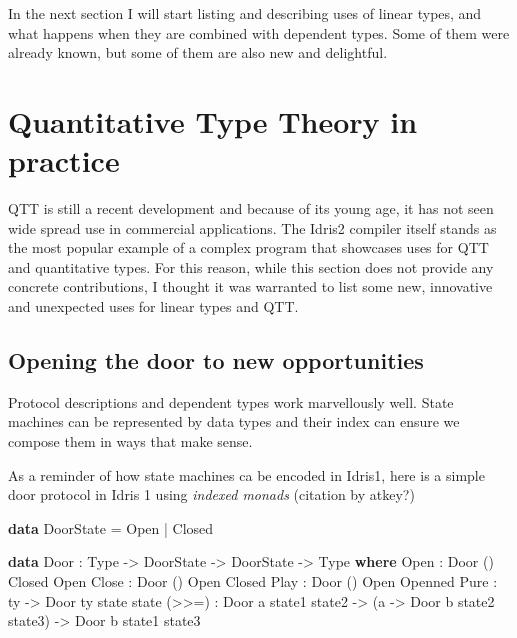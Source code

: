 \documentclass[
]{article}
\newenvironment{Shaded}{}{}
\newcommand{\DataTypeTok}[1]{\textcolor[rgb]{0.56,0.13,0.00}{#1}}
\newcommand{\KeywordTok}[1]{\textcolor[rgb]{0.00,0.44,0.13}{\textbf{#1}}}
\newcommand{\NormalTok}[1]{#1}
\newcommand{\OperatorTok}[1]{\textcolor[rgb]{0.40,0.40,0.40}{#1}}
\newcommand{\OtherTok}[1]{\textcolor[rgb]{0.00,0.44,0.13}{#1}}
\begin{document}
In the next section I will start listing and describing uses of linear
types, and what happens when they are combined with dependent types.
Some of them were already known, but some of them are also new and
delightful.

\hypertarget{quantitative-type-theory-in-practice}{%
\section{Quantitative Type Theory in
practice}\label{quantitative-type-theory-in-practice}}

QTT is still a recent development and because of its young age, it has
not seen wide spread use in commercial applications. The Idris2 compiler
itself stands as the most popular example of a complex program that
showcases uses for QTT and quantitative types. For this reason, while
this section does not provide any concrete contributions, I thought it
was warranted to list some new, innovative and unexpected uses for
linear types and QTT.

\hypertarget{opening-the-door-to-new-opportunities}{%
\subsection{Opening the door to new
opportunities}\label{opening-the-door-to-new-opportunities}}

Protocol descriptions and dependent types work marvellously well. State
machines can be represented by data types and their index can ensure we
compose them in ways that make sense.

As a reminder of how state machines ca be encoded in Idris1, here is a
simple door protocol in Idris 1 using \emph{indexed monads} (citation by
atkey?)

\begin{Shaded}
\begin{Highlighting}[]
\KeywordTok{data} \DataTypeTok{DoorState} \OtherTok{=} \DataTypeTok{Open} \OperatorTok{|} \DataTypeTok{Closed}

\KeywordTok{data} \DataTypeTok{Door} \OperatorTok{:} \DataTypeTok{Type} \OtherTok{{-}\textgreater{}} \DataTypeTok{DoorState} \OtherTok{{-}\textgreater{}} \DataTypeTok{DoorState} \OtherTok{{-}\textgreater{}} \DataTypeTok{Type} \KeywordTok{where} 
    \DataTypeTok{Open} \OperatorTok{:} \DataTypeTok{Door}\NormalTok{ () }\DataTypeTok{Closed} \DataTypeTok{Open}
    \DataTypeTok{Close} \OperatorTok{:} \DataTypeTok{Door}\NormalTok{ () }\DataTypeTok{Open} \DataTypeTok{Closed}
    \DataTypeTok{Play} \OperatorTok{:} \DataTypeTok{Door}\NormalTok{ () }\DataTypeTok{Open} \DataTypeTok{Openned}
    \DataTypeTok{Pure} \OperatorTok{:}\NormalTok{ ty }\OtherTok{{-}\textgreater{}} \DataTypeTok{Door}\NormalTok{ ty state state}
\NormalTok{    (}\OperatorTok{\textgreater{}\textgreater{}=}\NormalTok{) }\OperatorTok{:} \DataTypeTok{Door}\NormalTok{ a state1 state2 }\OtherTok{{-}\textgreater{}}
\NormalTok{             (a }\OtherTok{{-}\textgreater{}} \DataTypeTok{Door}\NormalTok{ b state2 state3) }\OtherTok{{-}\textgreater{}}
             \DataTypeTok{Door}\NormalTok{ b state1 state3}
\end{Highlighting}
\end{Shaded}
\end{document}
